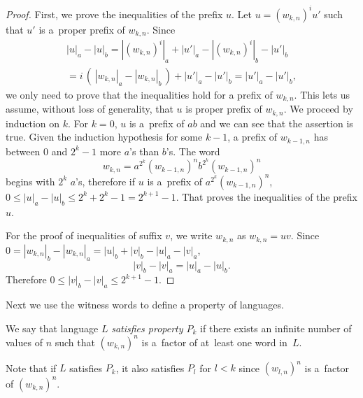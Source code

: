 \begin{proof}
    First, we prove the inequalities of the prefix $u$. Let $u = {(w_{k,n})}^i u'$ such that $u'$ is a~proper prefix of $w_{k,n}$. Since
    \begin{multline*}
        |u|_a - |u|_b = |{(w_{k,n})}^i|_a + |u'|_a - |{(w_{k,n})}^i|_b - |u'|_b \\
        = i \, ( \, |w_{k,n}|_a - |w_{k,n}|_b \, ) + |u'|_a - |u'|_b = |u'|_a - |u'|_b,
    \end{multline*}
    we only need to prove that the inequalities hold for a prefix of $w_{k,n}$. This lets us assume, without loss of generality, that $u$ is proper prefix of $w_{k,n}$. We proceed by induction on $k$. For $k = 0$, $u$ is a~prefix of $ab$ and we can see that the assertion is true. Given the induction hypothesis for some $k - 1$, a prefix of $w_{k-1,n}$ has between $0$ and $2^k-1$ more $a$'s than $b$'s. The word
    \[
        w_{k,n} = a^{2^k} {(w_{k-1,n})}^n b^{2^k} {(w_{k-1,n})}^n
    \]
    begins with $2^k$ $a$'s, therefore if $u$ is a~prefix of $a^{2^k} {(w_{k-1,n})}^n$, $0 \leq |u|_a - |u|_b \leq 2^k+2^k-1 = 2^{k+1}-1$. That proves the inequalities of the prefix $u$.

    For the proof of inequalities of suffix $v$, we write $w_{k,n}$ as $w_{k,n} = uv$. Since $0 = |w_{k,n}|_b - |w_{k,n}|_a = |u|_b + |v|_b - |u|_a - |v|_a$,
    \[
        |v|_b - |v|_a = |u|_a - |u|_b.
    \]
    Therefore $0 \leq |v|_b - |v|_a \leq 2^{k+1}-1$.
\end{proof}

Next we use the witness words to define a property of languages.

\begin{defn}
    We say that language $L$ \emph{satisfies property $P_k$} if there exists an infinite number of values of $n$ such that ${(w_{k,n})}^n$ is a~factor of at~least one word in~$L$.
\end{defn}

Note that if $L$ satisfies $P_k$, it also satisfies $P_l$ for $l < k$ since ${(w_{l,n})}^n$ is a~factor of ${(w_{k,n})}^n$.

